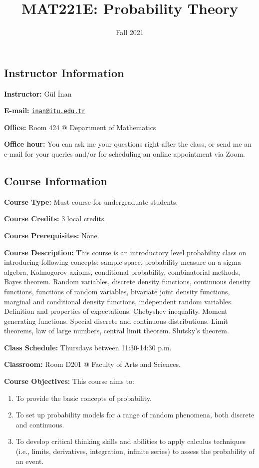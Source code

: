 \documentclass[
  12pt,
]{article}
\title{MAT221E: Probability Theory}
\author{}
\date{\vspace{-2.5em}Fall 2021}
\providecommand{\tightlist}{%
  \setlength{\itemsep}{0pt}\setlength{\parskip}{0pt}}
\begin{document}
\maketitle

\hypertarget{instructor-information}{%
\subsection{Instructor Information}\label{instructor-information}}

\textbf{Instructor:} Gül İnan

\textbf{E-mail:}
\href{mailto:inan@itu.edu.tr}{\nolinkurl{inan@itu.edu.tr}}

\textbf{Office:} Room 424 @ Department of Mathematics

\textbf{Office hour:} You can ask me your questions right after the
class, or send me an e-mail for your queries and/or for scheduling an
online appointment via Zoom.

\hypertarget{course-information}{%
\subsection{Course Information}\label{course-information}}

\textbf{Course Type:} Must course for undergraduate students.

\textbf{Course Credits:} 3 local credits.

\textbf{Course Prerequisites:} None.

\textbf{Course Description:} This course is an introductory level
probability class on introducing following concepts: sample space,
probability measure on a sigma-algebra, Kolmogorov axioms, conditional
probability, combinatorial methods, Bayes theorem. Random variables,
discrete density functions, continuous density functions, functions of
random variables, bivariate joint density functions, marginal and
conditional density functions, independent random variables. Definition
and properties of expectations. Chebyshev inequality. Moment generating
functions. Special discrete and continuous distributions. Limit
theorems, law of large numbers, central limit theorem. Slutsky's
theorem.

\textbf{Class Schedule:} Thursdays between 11:30-14:30 p.m.

\textbf{Classroom:} Room D201 @ Faculty of Arts and Sciences.

\textbf{Course Objectives:} This course aims to:

\begin{enumerate}
\def\labelenumi{\arabic{enumi}.}
\tightlist
\item
  To provide the basic concepts of probability.
\item
  To set up probability models for a range of random phenomena, both
  discrete and continuous.
\item
  To develop critical thinking skills and abilities to apply calculus
  techniques (i.e., limits, derivatives, integration, infinite series)
  to assess the probability of an event.
\end{enumerate}
\end{document}
